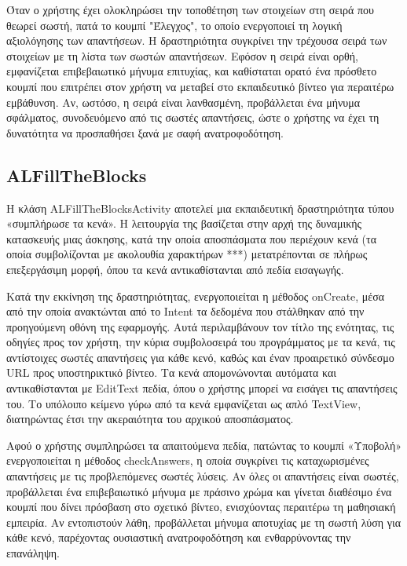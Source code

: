 \documentclass[11pt]{report}
\begin{document}
Όταν ο χρήστης έχει ολοκληρώσει την τοποθέτηση των στοιχείων στη σειρά που θεωρεί σωστή, πατά το κουμπί "Έλεγχος", το οποίο ενεργοποιεί τη λογική αξιολόγησης των απαντήσεων. Η δραστηριότητα συγκρίνει την τρέχουσα σειρά των στοιχείων με τη λίστα των σωστών απαντήσεων. Εφόσον η σειρά είναι ορθή, εμφανίζεται επιβεβαιωτικό μήνυμα επιτυχίας, και καθίσταται ορατό ένα πρόσθετο κουμπί που επιτρέπει στον χρήστη να μεταβεί στο εκπαιδευτικό βίντεο για περαιτέρω εμβάθυνση. Αν, ωστόσο, η σειρά είναι λανθασμένη, προβάλλεται ένα μήνυμα σφάλματος, συνοδευόμενο από τις σωστές απαντήσεις, ώστε ο χρήστης να έχει τη δυνατότητα να προσπαθήσει ξανά με σαφή ανατροφοδότηση.

\subsection{ALFillTheBlocks}

Η κλάση ALFillTheBlocksActivity αποτελεί μια εκπαιδευτική δραστηριότητα τύπου «συμπλήρωσε τα κενά». Η λειτουργία της βασίζεται στην αρχή της δυναμικής κατασκευής μιας άσκησης, κατά την οποία αποσπάσματα που περιέχουν κενά (τα οποία συμβολίζονται με ακολουθία χαρακτήρων ***) μετατρέπονται σε πλήρως επεξεργάσιμη μορφή, όπου τα κενά αντικαθίστανται από πεδία εισαγωγής. 

Κατά την εκκίνηση της δραστηριότητας, ενεργοποιείται η μέθοδος onCreate, μέσα από την οποία ανακτώνται από το Intent τα δεδομένα που στάλθηκαν από την προηγούμενη οθόνη της εφαρμογής. Αυτά περιλαμβάνουν τον τίτλο της ενότητας, τις οδηγίες προς τον χρήστη, την κύρια συμβολοσειρά του προγράμματος με τα κενά, τις αντίστοιχες σωστές απαντήσεις για κάθε κενό, καθώς και έναν προαιρετικό σύνδεσμο URL προς υποστηρικτικό βίντεο. Τα κενά απομονώνονται αυτόματα και αντικαθίστανται με EditText πεδία, όπου ο χρήστης μπορεί να εισάγει τις απαντήσεις του. Το υπόλοιπο κείμενο γύρω από τα κενά εμφανίζεται ως απλό TextView, διατηρώντας έτσι την ακεραιότητα του αρχικού αποσπάσματος.  

Αφού ο χρήστης συμπληρώσει τα απαιτούμενα πεδία, πατώντας το κουμπί «Υποβολή» ενεργοποιείται η μέθοδος checkAnswers, η οποία συγκρίνει τις καταχωρισμένες απαντήσεις με τις προβλεπόμενες σωστές λύσεις. Αν όλες οι απαντήσεις είναι σωστές, προβάλλεται ένα επιβεβαιωτικό μήνυμα με πράσινο χρώμα και γίνεται διαθέσιμο ένα κουμπί που δίνει πρόσβαση στο σχετικό βίντεο, ενισχύοντας περαιτέρω τη μαθησιακή εμπειρία. Αν εντοπιστούν λάθη, προβάλλεται μήνυμα αποτυχίας με τη σωστή λύση για κάθε κενό, παρέχοντας ουσιαστική ανατροφοδότηση και ενθαρρύνοντας την επανάληψη.
\end{document}
